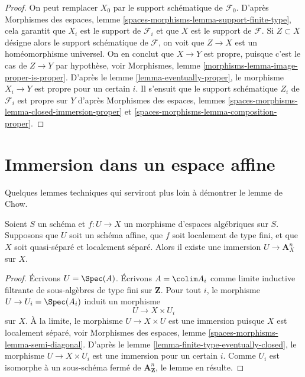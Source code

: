 \begin{proof}
On peut remplacer $X_0$ par le support schématique de $\mathcal{F}_0$.
D'après Morphismes des espaces, lemme \ref{spaces-morphisms-lemma-support-finite-type},
cela garantit que $X_i$ est le support de $\mathcal{F}_i$ et que $X$ est le
support de $\mathcal{F}$. Si $Z \subset X$ désigne alors le support
schématique de $\mathcal{F}$, on voit que $Z \to X$ est un homéomorphisme
universel. On en conclut que $X \to Y$ est propre, puisque c'est le cas de
$Z \to Y$ par hypothèse, voir
Morphismes, lemme \ref{morphisms-lemma-image-proper-is-proper}.
D'après le lemme \ref{lemma-eventually-proper}, le morphisme $X_i \to Y$ est propre
pour un certain $i$. Il s'ensuit que le support schématique $Z_i$ de
$\mathcal{F}_i$ est propre sur $Y$ d'après
Morphismes des espaces, lemmes
\ref{spaces-morphisms-lemma-closed-immersion-proper} et
\ref{spaces-morphisms-lemma-composition-proper}.
\end{proof}








\section{Immersion dans un espace affine}
\label{section-embedding}

\noindent
Quelques lemmes techniques qui serviront plus loin à démontrer le lemme de Chow.

\begin{lemma}
\label{lemma-embedding-into-affine-over-ls-qs}
Soient $S$ un schéma et $f : U \to X$ un morphisme d'espaces
algébriques sur $S$. Supposons que $U$ soit un schéma affine, que $f$ soit
localement de type fini, et que $X$ soit quasi-séparé et localement séparé.
Alors il existe une immersion $U \to \mathbf{A}^n_X$ sur $X$.
\end{lemma}

\begin{proof}
Écrivons $U = \Spec(A)$. Écrivons $A = \colim A_i$ comme limite inductive filtrante
de sous-algèbres de type fini sur $\mathbf{Z}$. Pour tout $i$, le morphisme
$U \to U_i = \Spec(A_i)$ induit un morphisme
$$
U \longrightarrow X \times U_i
$$
sur $X$. À la limite, le morphisme $U \to X \times U$ est une immersion
puisque $X$ est localement séparé, voir
Morphismes des espaces, lemme
\ref{spaces-morphisms-lemma-semi-diagonal}.
D'après le lemme \ref{lemma-finite-type-eventually-closed},
le morphisme $U \to X \times U_i$ est une immersion pour un certain $i$.
Comme $U_i$ est isomorphe à un sous-schéma fermé de
$\mathbf{A}^n_{\mathbf{Z}}$, le lemme en résulte.
\end{proof}

